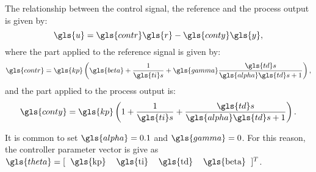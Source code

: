 \begin{refsection}
%
The relationship between the control signal, the reference and the process output is given by:
%
\begin{equation}  %
	\gls{u} = \gls{contr} \gls{r} - \gls{conty} \gls{y},
	\label{us}
\end{equation}
%
where the part applied to the reference signal is given by:
%
\begin{equation}  %
	\gls{contr}=  \gls{kp}\left({\gls{beta} + \frac{1}{\gls{ti} s}+ \gls{gamma} \frac{\gls{td} s}{\gls{alpha} \gls{td} s +1}}\right),
	\label{eq:cr}
\end{equation}
%
and the part applied to the process output is:
%
\begin{equation}  %
	\gls{conty}=  \gls{kp}\left({1 + \frac{1}{\gls{ti} s}+\frac{\gls{td} s}{\gls{alpha} \gls{td} s +1} }\right).
	\label{eq:cy}
\end{equation}

It is common to set $\gls{alpha}=0.1$ and $\gls{gamma}=0$. For this reason, the controller parameter vector is give as $\gls{theta}=[\begin{tabular}{cccc} \gls{kp} & \gls{ti} & \gls{td} &\gls{beta} \end{tabular}]^T$.

%
%
%


\end{refsection}
